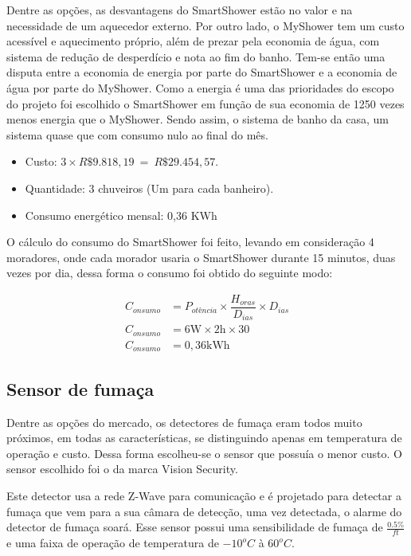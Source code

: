 Dentre as opções, as desvantagens do SmartShower\cite{SmartShoweriHouse} estão no valor e na necessidade de um aquecedor externo. Por outro lado, o MyShower\cite{MyShowertaQi} tem um custo acessível e aquecimento próprio, além de prezar pela economia de água, com sistema de redução de desperdício e nota ao fim do banho. Tem-se então uma disputa entre a economia de energia por parte do SmartShower e a economia de água por parte do MyShower. Como a energia é uma das prioridades do escopo do projeto foi escolhido o SmartShower em função de sua economia de 1250 vezes menos energia que o MyShower. Sendo assim, o sistema de banho da casa, um sistema quase que com consumo nulo ao final do mês.

\begin{itemize}
\item Custo: $3\times R\$ 9.818,19\ =\ R\$ 29.454,57.$
\item Quantidade: 3 chuveiros (Um para cada banheiro).
\item Consumo energético mensal: 0,36 KWh
\end{itemize}

	O cálculo do consumo do SmartShower foi feito, levando em consideração 4 moradores, onde cada morador usaria o SmartShower durante 15 minutos, duas vezes por dia, dessa forma o consumo foi obtido do seguinte modo: 

	\begin{equation} \label{consumo_energetico_mensal} \tag{e.q. consumo energético mensal}
	\begin{split}
	C_{onsumo} &= P_{otência}\times \dfrac{H_{oras}}{D_{ias}}\times D_{ias}\\
	C_{onsumo} &= 6 \si{\watt}\times 2\si{\hour}\times 30\\
	C_{onsumo} &= 0,36 \si{\kilo\watt\hour}
	\end{split}
	\end{equation}

\subsection{Sensor de fumaça}

	Dentre as opções do mercado, os detectores de fumaça eram todos muito próximos, em todas as características, se distinguindo apenas em temperatura de operação e custo. Dessa forma escolheu-se o sensor que possuía o menor custo. O sensor escolhido foi o da marca Vision Security\cite{FumacaZWave}.

	 Este detector usa a rede Z-Wave para comunicação e é projetado para detectar a fumaça que vem para a sua câmara de detecção, uma vez detectada, o alarme do detector de fumaça soará. Esse sensor possui uma sensibilidade de fumaça de $\tfrac{0.5\%}{ft}$ e uma faixa de operação de temperatura de $-10^oC$ à $60^oC$.

